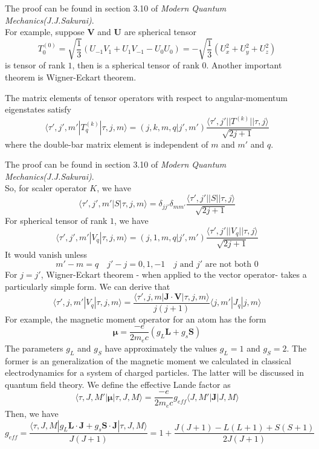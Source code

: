 \noindent
The proof can be found in section 3.10 of \emph{Modern Quantum Mechanics(J.J.Sakurai)}.\\
For example, suppose $\bm{V}$ and $\bm{U}$ are spherical tensor
\[T^{(0)}_{0} = \sqrt{\frac{1}{3}} (U_{-1}V_{1} + U_{1}V_{-1}-U_{0}U_{0}) = - \sqrt{\frac{1}{3}} (U_x^2 + U_y^2 + U_z^2)\]
is tensor of rank $1$, then is a spherical tensor of rank $0$. Another important theorem is Wigner-Eckart theorem.
\begin{newthem}
The matrix elements of tensor operators with respect to angular-momentum eigenstates satisfy
\[\langle \tau',j',m'| T^{(k)}_{q}| \tau,j,m\rangle = (j,k,m,q|j',m') \frac{\langle \tau',j' || T^{(k)} || \tau,j\rangle}{\sqrt{2j+1}}\]
where the double-bar matrix element is independent of $m$ and $m'$ and $q$.
\end{newthem}
\noindent
The proof can be found in section 3.10 of \emph{Modern Quantum Mechanics(J.J.Sakurai)}.\\
So, for scaler operator $K$, we have
\[\langle \tau',j',m'| S| \tau,j,m\rangle = \delta_{jj'}\delta_{mm'} \frac{\langle \tau',j' || S || \tau,j\rangle}{\sqrt{2j+1}}\]
For spherical tensor of rank $1$, we have
\[\langle \tau',j',m'| V_{q} | \tau,j,m\rangle = (j,1,m,q|j',m') \frac{\langle \tau',j' || V_q || \tau,j\rangle}{\sqrt{2j+1}}\]
It would vanish unless
\[m'-m = q \quad j'-j = 0,1,-1 \quad j \mbox{ and } j' \mbox{ are not both  } 0\]
For $j=j'$, Wigner-Eckart theorem - when applied to the vector operator- takes a particularly simple form. We can derive that
\[\langle \tau',j,m' | V_q | \tau, j ,m \rangle = \frac{\langle \tau',j,m | \bm{J}\cdot\bm{V} | \tau, j ,m \rangle}{j(j+1)} \langle j,m' | J_q | j ,m \rangle\]
For example, the magnetic moment operator for an atom has the form
\[\bm{\mu} = \frac{-e}{2m_e c} (g_L\bm{L} + g_s \bm{S})\]
The parameters $g_L$ and $g_S$ have approximately the
values $g_L = 1$ and $g_S = 2$. The former is an generalization of the magnetic moment we calculated in classical electrodynamics for a system of charged particles. The latter will be discussed in quantum field theory.
We define the effective Lande factor as
\[\langle \tau,J,M' | \bm{\mu} | \tau,J,M \rangle = \frac{-e}{2m_e c} g_{eff} \langle J,M' | \bm{J} | J,M \rangle\]
Then, we have
\[g_{eff} = \frac{\langle \tau,J,M | g_L\bm{L}\cdot\bm{J} + g_s \bm{S}\cdot\bm{J} | \tau,J,M \rangle}{J(J+1)} = 1 + \frac{J(J+1)- L(L+1) + S(S+1)}{2J(J+1)}\]

